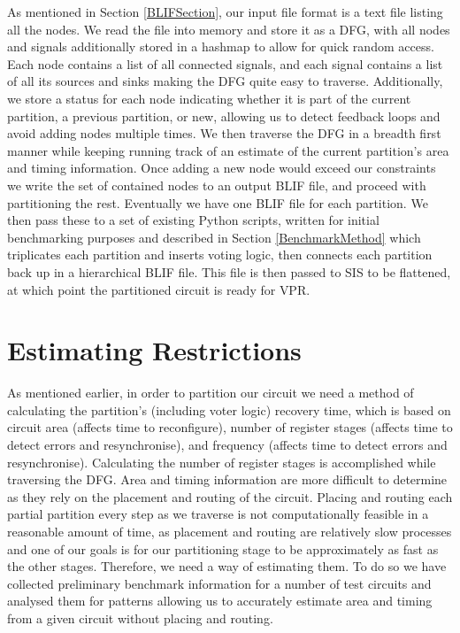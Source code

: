 \documentclass[12pt,final,oneside]{dwThesis} %
\begin{document}
As mentioned in Section \ref{BLIFSection}, our input file format is a text file listing all the nodes. We read the file into memory and store it as a \ac{DFG}, with all nodes and signals additionally stored in a hashmap to allow for quick random access. Each node contains a list of all connected signals, and each signal contains a list of all its sources and sinks making the \ac{DFG} quite easy to traverse. Additionally, we store a status for each node indicating whether it is part of the current partition, a previous partition, or new, allowing us to detect feedback loops and avoid adding nodes multiple times.
We then traverse the \ac{DFG} in a breadth first manner while keeping running track of an estimate of the current partition's area and timing information. Once adding a new node would exceed our constraints we write the set of contained nodes to an output \ac{BLIF} file, and proceed with partitioning the rest. Eventually we have one \ac{BLIF} file for each partition. We then pass these to a set of existing Python scripts, written for initial benchmarking purposes and described in Section \ref{BenchmarkMethod} which triplicates each partition and inserts voting logic, then connects each partition back up in a hierarchical \ac{BLIF} file. This file is then passed to \ac{SIS} to be flattened, at which point the partitioned circuit is ready for \ac{VPR}.


\section{Estimating Restrictions}
As mentioned earlier, in order to partition our circuit we need a method of calculating the partition's (including voter logic) recovery time, which is based on circuit area (affects time to reconfigure), number of register stages (affects time to detect errors and resynchronise), and frequency (affects time to detect errors and resynchronise). Calculating the number of register stages is accomplished while traversing the \ac{DFG}.
Area and timing information are more difficult to determine as they rely on the placement and routing of the circuit. Placing and routing each partial partition every step as we traverse is not computationally feasible in a reasonable amount of time, as placement and routing are relatively slow processes and one of our goals is for our partitioning stage to be approximately as fast as the other stages. Therefore, we need a way of estimating them. To do so we have collected preliminary benchmark information for a number of test circuits and analysed them for patterns allowing us to accurately estimate area and timing from a given circuit without placing and routing.
\end{document}
